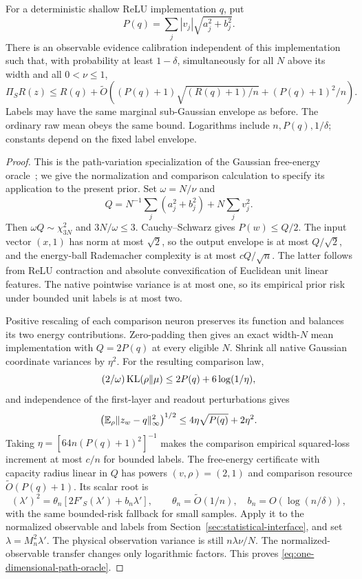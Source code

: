 \begin{lemma}
\label{lem:shallow-path-interface}
For a deterministic shallow ReLU implementation $q$, put
\[
 P(q)=\sum_j|v_j|\sqrt{a_j^2+b_j^2}.
\]
There is an observable evidence calibration independent of this
implementation such that, with probability at least $1-\delta$,
simultaneously for all $N$ above its width and all $0<\nu\le1$,
\[
 \Pi_SR(z)\le R(q)+\widetilde O\left(
 (P(q)+1)\sqrt{(R(q)+1)/n}+(P(q)+1)^2/n\right).
 \label{eq:one-dimensional-path-oracle}
\]
Labels may have the same marginal sub-Gaussian envelope as before.
The ordinary raw mean obeys the same bound. Logarithms include
$n,P(q),1/\delta$; constants depend on the fixed label envelope.
\end{lemma}
\begin{proof}
This is the path-variation specialization of the Gaussian free-energy
oracle~\cite{adaptive}; we give the normalization and comparison
calculation to specify its application to the present prior.
Set $\omega=N/\nu$ and
\[
 Q=N^{-1}\sum_j(a_j^2+b_j^2)+N\sum_jv_j^2.
\]
Then $\omega Q\sim\chi^2_{3N}$ and $3N/\omega\le3$.
Cauchy--Schwarz gives $P(w)\le Q/2$. The input vector $(x,1)$ has
norm at most $\sqrt2$, so the output envelope is at most $Q/\sqrt2$,
and the energy-ball Rademacher complexity is at most $cQ/\sqrt n$.
The latter follows from ReLU contraction and absolute convexification
of Euclidean unit linear features. The native pointwise variance is
at most one, so its empirical prior risk under bounded unit labels
is at most two.

Positive rescaling of each comparison neuron preserves its function
and balances its two energy contributions. Zero-padding then gives an
exact width-$N$ mean implementation with $Q=2P(q)$ at every eligible
$N$. Shrink all native Gaussian coordinate variances by $\eta^2$.
For the resulting comparison law,
\[
 (2/\omega)\operatorname{KL}(\rho\|\mu)
       \le2P(q)+6\log(1/\eta),
\]
and independence of the first-layer and readout perturbations gives
\[
 \bigl(\mathbb E_\rho\|z_w-q\|_\infty^2\bigr)^{1/2}
       \le4\eta\sqrt{P(q)}+2\eta^2.
\]
Taking $\eta=[64n(P(q)+1)^2]^{-1}$ makes the comparison empirical
squared-loss increment at most $c/n$ for bounded labels.
The free-energy certificate with capacity radius linear in $Q$ has
powers $(v,\rho)=(2,1)$ and comparison resource
$\widetilde O(P(q)+1)$. Its scalar root is
\[
 (\lambda')^2=\theta_n[2F'_S(\lambda')+b_n\lambda'],
 \qquad \theta_n=\widetilde O(1/n),\quad b_n=O(\log(n/\delta)),
\]
with the same bounded-risk fallback for small samples. Apply it to
the normalized observable and labels from
Section~\ref{sec:statistical-interface}, and set
$\lambda=M_n^2\lambda'$. The physical observation variance is still
$n\lambda\nu/N$. The normalized-observable transfer changes only
logarithmic factors. This proves \eqref{eq:one-dimensional-path-oracle}.
\end{proof}


